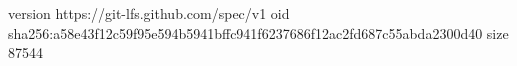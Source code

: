 version https://git-lfs.github.com/spec/v1
oid sha256:a58e43f12c59f95e594b5941bffc941f6237686f12ac2fd687c55abda2300d40
size 87544
